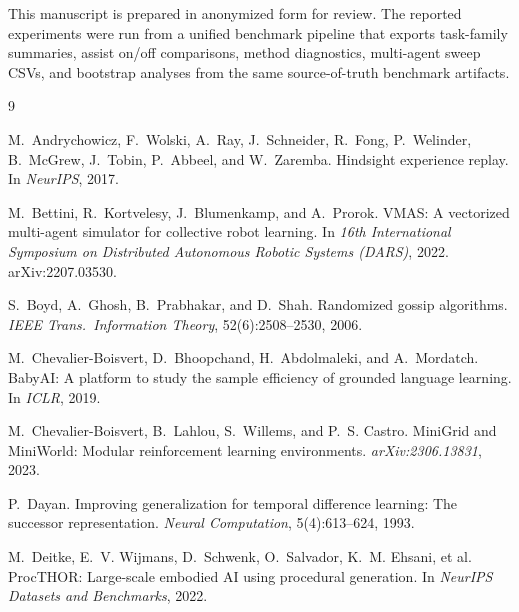 \documentclass{article}
\begin{document}
\begin{ack}
This manuscript is prepared in anonymized form for review. The
reported experiments were run from a unified benchmark pipeline that
exports task-family summaries, assist on/off comparisons, method
diagnostics, multi-agent sweep CSVs, and bootstrap analyses from the
same source-of-truth benchmark artifacts.
\end{ack}

{\small
\begin{thebibliography}{9}

M.~Andrychowicz, F.~Wolski, A.~Ray, J.~Schneider, R.~Fong, P.~Welinder, B.~McGrew, J.~Tobin, P.~Abbeel, and W.~Zaremba.
\newblock Hindsight experience replay.
\newblock In \emph{NeurIPS}, 2017.

M.~Bettini, R.~Kortvelesy, J.~Blumenkamp, and A.~Prorok.
\newblock VMAS: A vectorized multi-agent simulator for collective robot learning.
\newblock In \emph{16th International Symposium on Distributed Autonomous Robotic Systems (DARS)}, 2022.
\newblock arXiv:2207.03530.

S.~Boyd, A.~Ghosh, B.~Prabhakar, and D.~Shah.
\newblock Randomized gossip algorithms.
\newblock \emph{IEEE Trans.\ Information Theory}, 52(6):2508--2530, 2006.

M.~Chevalier-Boisvert, D.~Bhoopchand, H.~Abdolmaleki, and A.~Mordatch.
\newblock BabyAI: A platform to study the sample efficiency of grounded language learning.
\newblock In \emph{ICLR}, 2019.

M.~Chevalier-Boisvert, B.~Lahlou, S.~Willems, and P.~S. Castro.
\newblock MiniGrid and MiniWorld: Modular reinforcement learning environments.
\newblock \emph{arXiv:2306.13831}, 2023.

P.~Dayan.
\newblock Improving generalization for temporal difference learning: The successor representation.
\newblock \emph{Neural Computation}, 5(4):613--624, 1993.

M.~Deitke, E.~V. Wijmans, D.~Schwenk, O.~Salvador, K.~M. Ehsani, et al.
\newblock ProcTHOR: Large-scale embodied AI using procedural generation.
\newblock In \emph{NeurIPS Datasets and Benchmarks}, 2022.


\end{thebibliography}}
\end{document}
